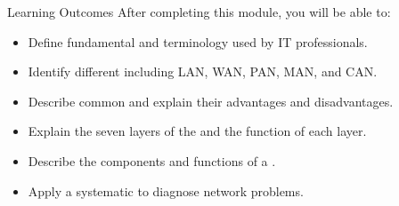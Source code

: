 \documentclass[aspectratio=169]{beamer}  %
\begin{document}
\begin{frame}{Learning Outcomes}
    After completing this module, you will be able to:
    \vspace{0.5em}
    \begin{itemize}
        \item Define fundamental  and terminology used by IT professionals.
        \item Identify different  including LAN, WAN, PAN, MAN, and CAN.
        \item Describe common  and explain their advantages and disadvantages.
        \item Explain the seven layers of the  and the function of each layer.
        \item Describe the components and functions of a .
        \item Apply a systematic  to diagnose network problems.
    \end{itemize}
\end{frame}
\end{document}
